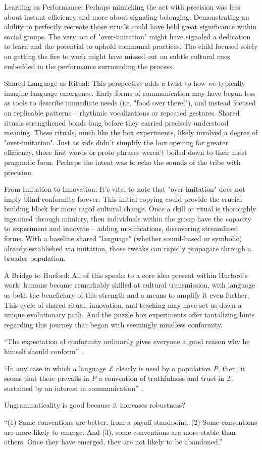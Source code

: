 Learning as Performance: Perhaps mimicking the act with precision was less about instant efficiency and more about signaling belonging. Demonstrating an ability to perfectly recreate those rituals could have held great  significance within social groups. The very act of "over-imitation" might have signaled  a dedication to learn and the potential to uphold communal practices. The child focused solely on getting the fire to  work might have missed out on subtle cultural cues embedded in the performance surrounding the process.

Shared Language as Ritual: This perspective adds a twist to how we typically imagine language emergence. Early forms of communication may have begun less as  tools to describe immediate needs (i.e. "food over there!"), and instead focused on replicable patterns – rhythmic vocalizations or repeated gestures. Shared rituals strengthened bonds long before they carried precisely understood meaning. These rituals, much like the box experiments, likely involved a degree of "over-imitation". Just as kids didn't simplify the box opening for greater efficiency, those first words or proto-phrases weren't boiled down to their most pragmatic form. Perhaps the intent was to echo the sounds of the tribe with precision.

From Imitation to Innovation: It's vital to note that "over-imitation" does not imply blind conformity forever. This initial copying could provide the crucial building block for more rapid cultural change.  Once a skill or ritual is thoroughly ingrained through mimicry, then individuals within the group have the capacity to experiment and  innovate – adding modifications,  discovering streamlined forms.   With a baseline shared "language" (whether sound-based or symbolic) already established via imitation, those tweaks can rapidly propagate through a broader population.

A Bridge to Hurford: All of this speaks to a core idea present within Hurford's work:  humans became remarkably skilled at cultural transmission, with language as both the beneficiary of this strength and a means to amplify it even further. This cycle of shared ritual, innovation, and teaching may have set us down a unique evolutionary path. And the puzzle  box experiments offer tantalizing hints regarding this journey that began with seemingly mindless conformity.




``The expectation of conformity ordinarily gives everyone a good reason why he himself should conform'' \cite[167]{Lewis1983}.

``In any case in which a language \textit{£} clearly is used by a population \textit{P}, then, it seems that there prevails in \textit{P} a convention of truthfulness and trust in \textit{£}, sustained by an interest in communication'' \cite[168]{Lewis1983}.

Ungrammaticality is good because it increases robustness?

``(1) Some conventions are better, from a payoff standpoint. (2) Some conventions are more likely to emerge. And (3), some conventions are more stable than others. Once they have emerged, they are not likely to be abandoned.'' \citep{OConnor2021b}